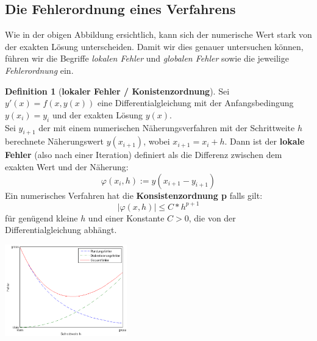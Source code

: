 \documentclass{article}
\newenvironment{Figure}
	{\par\medskip\noindent\minipage{\linewidth}}
	{\endminipage\par\medskip}
\theoremstyle{satz}
\theoremstyle{definition}
\newtheorem{definition}{Definition}
\begin{document}
\subsection{Die Fehlerordnung eines Verfahrens}
Wie in der obigen Abbildung ersichtlich, kann sich der numerische Wert stark von der exakten Lösung unterscheiden. Damit wir dies genauer untersuchen können, führen wir die Begriffe \textit{lokalen Fehler} und \textit{globalen Fehler} sowie die jeweilige \textit{Fehlerordnung} ein.

\begin{tcolorbox}
\begin{definition}[\textbf{lokaler Fehler / Konistenzordnung}]
Sei $y'(x) = f(x,y(x))$ eine Differentialgleichung mit der Anfangsbedingung $y(x_i) = y_i$ und der exakten Lösung $y(x)$.\\
Sei $y_{i+1}$ der mit einem numerischen Näherungsverfahren mit der Schrittweite $h$ berechnete Näherungswert $y(x_{i+1})$, wobei $x_{i+1} = x_i + h$. Dann ist der \textbf{lokale Fehler} (also nach einer Iteration) definiert als die Differenz zwischen dem exakten Wert und der Näherung:
\begin{equation}
\varphi(x_i,h) := y(x_{i+1} - y_{i+1})
\end{equation}
Ein numerisches Verfahren hat die \textbf{Konsistenzordnung p} falls gilt:
\begin{equation}
|\varphi(x,h)|\leq C * h^{p+1} 
\end{equation}
für genügend kleine $h$ und einer Konstante $C > 0$, die von der Differentialgleichung abhängt.\\
\begin{Figure}
\centering
\includegraphics[width=200px]{img/lokalerFehler.png}
	\label{fig:Verhalten des Rundungsfehlers und des Diskretisierungsfehlers}
\end{Figure}
\end{definition}
\end{tcolorbox}
\end{document}
